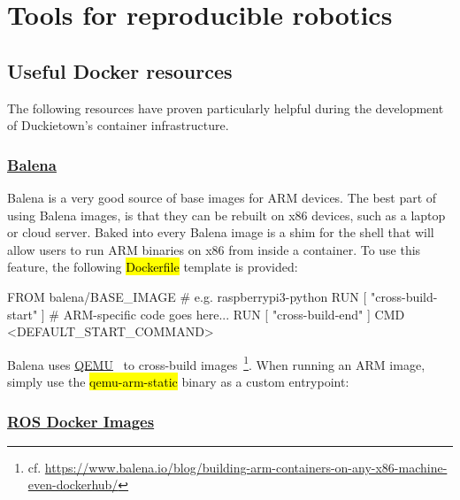 \documentclass[12pt,initial,twoside,maitrise]{dms}
\newcommand{\inline}[1]{%
    \begingroup%
    \sethlcolor{slightgray}%
    \hl{\ttfamily\small #1}%
    \endgroup
}
\numberwithin{equation}{section}
\numberwithin{table}{chapter}
\numberwithin{figure}{chapter}
\begin{document}
\chapter{Tools for reproducible robotics}

\section{Useful Docker resources}

The following resources have proven particularly helpful during the development of Duckietown's container infrastructure.

\subsection{\href{https://www.balena.io/}{Balena}}\label{subsec:balena}

Balena is a very good source of base images for ARM devices. The best part of using Balena images, is that they can be rebuilt on x86 devices, such as a laptop or cloud server. Baked into every Balena image is a shim for the shell that will allow users to run ARM binaries on x86 from inside a container. To use this feature, the following \inline{Dockerfile} template is provided:
%
\begin{dockerlisting}
FROM balena/BASE_IMAGE # e.g. raspberrypi3-python
RUN [ "cross-build-start" ]
# ARM-specific code goes here...
RUN [ "cross-build-end" ]
CMD <DEFAULT_START_COMMAND>
\end{dockerlisting}
%
Balena uses \href{https://www.qemu.org/}{QEMU}~\citep{bellard2005qemu} to cross-build images~\footnote{cf. \href{https://www.balena.io/blog/building-arm-containers-on-any-x86-machine-even-dockerhub/}{https://www.balena.io/blog/building-arm-containers-on-any-x86-machine-even-dockerhub/}}. When running an ARM image, simply use the \inline{qemu-arm-static} binary as a custom entrypoint:
%

\subsection{\href{https://hub.docker.com/_/ros}{ROS Docker Images}}
\end{document}
